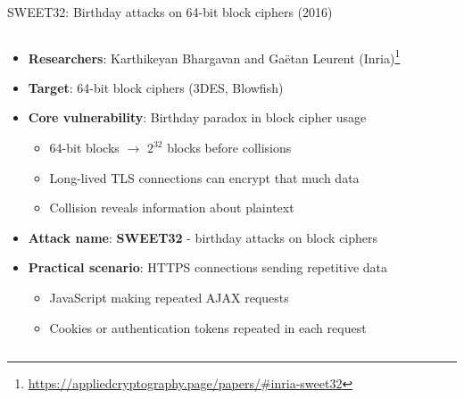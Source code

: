 \documentclass[aspectratio=169, lualatex, handout]{beamer}
\begin{document}
\begin{frame}{SWEET32: Birthday attacks on 64-bit block ciphers (2016)}
	\begin{columns}[c]
		\begin{column}{1\textwidth}
			\begin{itemize}[<+->]
				\item \textbf{Researchers}: Karthikeyan Bhargavan and Gaëtan Leurent (Inria)\footnote{\url{https://appliedcryptography.page/papers/\#inria-sweet32}}
				\item \textbf{Target}: 64-bit block ciphers (3DES, Blowfish)
				\item \textbf{Core vulnerability}: Birthday paradox in block cipher usage
				      \begin{itemize}
					      \item 64-bit blocks $\rightarrow$ $2^{32}$ blocks before collisions
					      \item Long-lived TLS connections can encrypt that much data
					      \item Collision reveals information about plaintext
				      \end{itemize}
				\item \textbf{Attack name}: \textbf{SWEET32} - birthday attacks on block ciphers
				\item \textbf{Practical scenario}: HTTPS connections sending repetitive data
				      \begin{itemize}
					      \item JavaScript making repeated AJAX requests
					      \item Cookies or authentication tokens repeated in each request
				      \end{itemize}
			\end{itemize}
		\end{column}
	\end{columns}
\end{frame}
\end{document}
